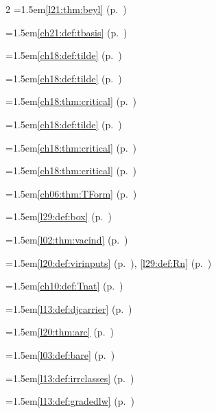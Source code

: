 \begin{multicols}{2}
\hangindent=1.5em\quad \ref{l21:thm:beyl} (p.~\pageref{l21:thm:beyl})\par
\hangindent=1.5em\quad \ref{ch21:def:tbasis} (p.~\pageref{ch21:def:tbasis})\par
\hangindent=1.5em\quad \ref{ch18:def:tilde} (p.~\pageref{ch18:def:tilde})\par
\hangindent=1.5em\quad \ref{ch18:def:tilde} (p.~\pageref{ch18:def:tilde})\par
\hangindent=1.5em\quad \ref{ch18:thm:critical} (p.~\pageref{ch18:thm:critical})\par
\hangindent=1.5em\quad \ref{ch18:def:tilde} (p.~\pageref{ch18:def:tilde})\par
\hangindent=1.5em\quad \ref{ch18:thm:critical} (p.~\pageref{ch18:thm:critical})\par
\hangindent=1.5em\quad \ref{ch18:thm:critical} (p.~\pageref{ch18:thm:critical})\par
\hangindent=1.5em\quad \ref{ch06:thm:TForm} (p.~\pageref{ch06:thm:TForm})\par
\hangindent=1.5em\quad \ref{l29:def:box} (p.~\pageref{l29:def:box})\par
\hangindent=1.5em\quad \ref{l02:thm:vacind} (p.~\pageref{l02:thm:vacind})\par
\hangindent=1.5em\quad \ref{l20:def:virinputs} (p.~\pageref{l20:def:virinputs}), \ref{l29:def:Rn} (p.~\pageref{l29:def:Rn})\par
\hangindent=1.5em\quad \ref{ch10:def:Tnat} (p.~\pageref{ch10:def:Tnat})\par
\hangindent=1.5em\quad \ref{l13:def:djcarrier} (p.~\pageref{l13:def:djcarrier})\par
\hangindent=1.5em\quad \ref{l20:thm:arc} (p.~\pageref{l20:thm:arc})\par
\hangindent=1.5em\quad \ref{l03:def:bare} (p.~\pageref{l03:def:bare})\par
\hangindent=1.5em\quad \ref{l13:def:irrclasses} (p.~\pageref{l13:def:irrclasses})\par
\hangindent=1.5em\quad \ref{l13:def:gradedlw} (p.~\pageref{l13:def:gradedlw})\par

\end{multicols}
